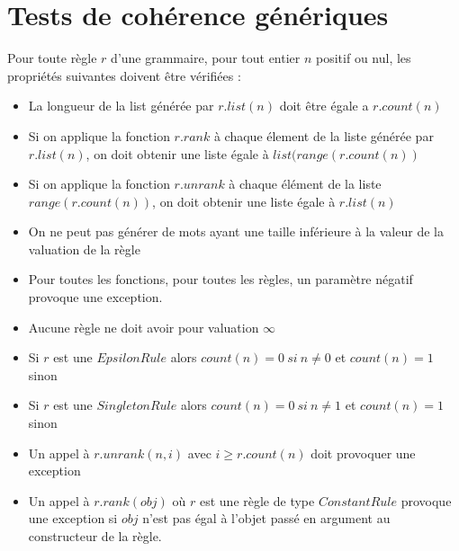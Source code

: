 \documentclass[a4paper, titlepage]{article}
\begin{document}
\section{Tests de cohérence génériques}

Pour toute règle $r$ d'une grammaire, pour tout entier $n$ positif ou
nul, les propriétés suivantes doivent être vérifiées :
\begin{itemize}
\item La longueur de la list générée par $r.list(n)$ doit être égale
  a $r.count(n)$\\
  
\item Si on applique la fonction $r.rank$ à chaque élement de la liste
  générée par $r.list(n)$, on doit obtenir une liste égale à
  $list(range(r.count(n))$\\
  
\item Si on applique la fonction $r.unrank$ à chaque élément de la
  liste $range(r.count(n))$, on doit obtenir une liste égale à $r.list(n)$\\
  
\item On ne peut pas générer de
  mots ayant une taille inférieure à la valeur de la valuation de la
  règle\\
  
\item Pour toutes les fonctions, pour toutes les règles, un paramètre négatif
  provoque une exception.\\

\item Aucune règle ne doit avoir pour valuation $\infty$\\

\item Si $r$ est une $EpsilonRule$ alors $count(n) = 0\ si\ n \neq 0$
  et $count(n) = 1$ sinon \\
  
\item Si $r$ est une $SingletonRule$ alors $count(n) = 0\ si\ n \neq
  1$ et $count(n)=1$ sinon \\

\item Un appel à $r.unrank(n, i)$ avec $i \geq r.count(n)$ doit provoquer
  une exception\\

\item Un appel à $r.rank(obj)$ où $r$ est une règle de type
  $ConstantRule$ provoque une exception si $obj$ n'est pas égal à
  l'objet passé en argument au constructeur de la règle.\\
  

\end{itemize}
\end{document}
